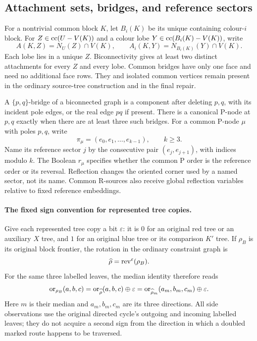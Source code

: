 \subsection{Attachment sets, bridges, and reference sectors}
\label{gen:sectors}

For a nontrivial common block $K$, let $B_i(K)$ be its unique containing
colour-$i$ block.  For $Z\in\operatorname{cc}(U-V(K))$ and a colour lobe
$Y\in\operatorname{cc}(B_i(K)-V(K))$, write
\[
 A(K,Z)=N_U(Z)\cap V(K),\qquad
 A_i(K,Y)=N_{B_i(K)}(Y)\cap V(K).
\]
Each lobe lies in a unique $Z$.  Biconnectivity gives at least two distinct
attachments for every $Z$ and every lobe.  Common bridges have only one
face and need no additional face rows.  They and isolated common vertices
remain present in the ordinary source-tree construction and in the final
repair.

A $\{p,q\}$-bridge of a biconnected graph is a component after deleting
$p,q$, with its incident pole edges, or the real edge $pq$ if present.
There is a canonical P-node at $p,q$ exactly when there are at least three
such bridges.  For a common P-node $\mu$ with poles $p,q$, write
\[
 \pi_\mu=(e_0,e_1,\ldots,e_{k-1}),\qquad k\geq 3.
\]
Name its reference sector $j$ by the consecutive pair
$(e_j,e_{j+1})$, with indices modulo $k$.  The Boolean $r_\mu$ specifies
whether the common P order is the reference order or its reversal.
Reflection changes the oriented corner used by a named sector, not its
name.  Common R-sources also receive global reflection variables relative
to fixed reference embeddings.

\paragraph{The fixed sign convention for represented tree copies.}
Give each represented tree copy a bit $\varepsilon$: it is $0$ for an
original red tree or an auxiliary $X$ tree, and $1$ for an original blue
tree or its comparison $K'$ tree.  If $\rho_B$ is its original block
frontier, the rotation in the ordinary constraint graph is
\[
 \widehat\rho=\operatorname{rev}^{\varepsilon}(\rho_B).
\]
For the same three labelled leaves, the median identity therefore reads
\begin{equation}
 \operatorname{or}_{\rho_B}(a,b,c)
   =\operatorname{or}_{\widehat\rho}(a,b,c)\oplus\varepsilon
   =\operatorname{or}_{\widehat\rho_m}(a_m,b_m,c_m)\oplus\varepsilon.
 \label{gen:copy-sign}
\end{equation}
Here $m$ is their median and $a_m,b_m,c_m$ are its three directions.
All side observations use the original directed cycle's outgoing and
incoming labelled leaves; they do not acquire a second sign from the
direction in which a doubled marked route happens to be traversed.

